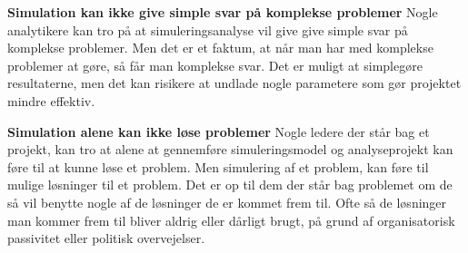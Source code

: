\vspace{5mm}

\textbf{Simulation kan ikke give simple svar på komplekse problemer}
Nogle analytikere kan tro på at simuleringsanalyse vil give give simple svar på komplekse problemer. Men det er et faktum, at når man har med komplekse problemer at gøre, så får man komplekse svar. Det er muligt at simplegøre resultaterne, men det kan risikere at undlade nogle parametere som gør projektet mindre effektiv.

\vspace{5mm}

\textbf{Simulation alene kan ikke løse problemer}
Nogle ledere der står bag et projekt, kan tro at alene at gennemføre simuleringsmodel og analyseprojekt kan føre til at kunne løse et problem. Men simulering af et problem, kan føre til mulige løsninger til et problem. Det er op til dem der står bag problemet om de så vil benytte nogle af de løsninger de er kommet frem til.  Ofte så de løsninger man kommer frem til bliver aldrig eller dårligt brugt, på grund af organisatorisk passivitet eller politisk overvejelser. \cite[s. 20]{SimulationHandbook}